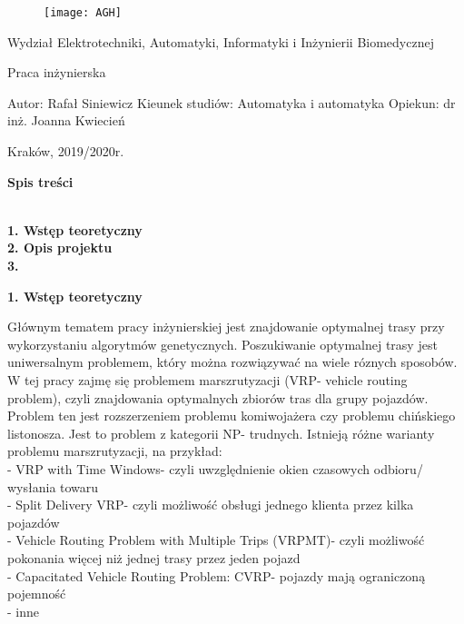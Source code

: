 \documentclass[12pt]{article}
\begin{document}
	
	\begin{figure}[t]
		\texttt{[image: AGH]}
		\centering
	\end{figure}
	
	\begin{center}
		Wydział Elektrotechniki, Automatyki, Informatyki i Inżynierii Biomedycznej 
		\vspace{10mm} %
	
		Praca inżynierska 
	\end{center}
	
	\vfill
	\begin{flushleft}
		Autor: Rafał Siniewicz \newline
		Kieunek studiów: Automatyka i automatyka \newline 
		Opiekun: dr inż. Joanna Kwiecień \newline
	
	\end{flushleft}
	
	\begin{center}Kraków, 2019/2020r.\end{center}
	
	\newpage
	
	\begin{flushleft}
		\begin{large}\textbf{Spis treści}\end{large}
		\textbf{
			\\1. Wstęp teoretyczny\\
			2. Opis projektu\\
			3. 
		}
	\end{flushleft}
	\newpage
	
		
	\begin{large}\textbf{1. Wstęp teoretyczny}\end{large}
	\vspace{10mm} %
	
	\hspace{5mm}Głównym tematem pracy inżynierskiej jest znajdowanie optymalnej trasy przy wykorzystaniu algorytmów genetycznych. Poszukiwanie optymalnej trasy jest uniwersalnym problemem, który można rozwiązywać na wiele róznych sposobów. W tej pracy zajmę się problemem marszrutyzacji (VRP- vehicle routing problem), czyli znajdowania optymalnych zbiorów tras dla grupy pojazdów. Problem ten jest rozszerzeniem problemu komiwojażera czy problemu chińskiego listonosza. Jest to problem z kategorii NP- trudnych. Istnieją różne warianty problemu marszrutyzacji, na przykład:\\ 
	- VRP with Time Windows- czyli uwzględnienie okien czasowych odbioru/ wysłania towaru\\
	- Split Delivery VRP- czyli możliwość obsługi jednego klienta przez kilka pojazdów\\
	- Vehicle Routing Problem with Multiple Trips (VRPMT)- czyli możliwość pokonania więcej niż jednej trasy przez jeden pojazd\\
	- Capacitated Vehicle Routing Problem: CVRP- pojazdy mają ograniczoną pojemność\\ 
	- inne\\
\end{document}
